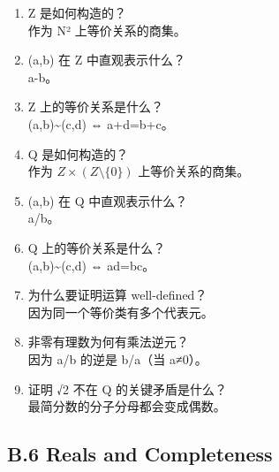 \documentclass[
  11pt,
]{article}
\begin{document}
\begin{enumerate}
\def\labelenumi{\arabic{enumi}.}
\setcounter{enumi}{40}
\item
  Z 是如何构造的？\\
  作为 N² 上等价关系的商集。
\item
  (a,b) 在 Z 中直观表示什么？\\
  a-b。
\item
  Z 上的等价关系是什么？\\
  (a,b)\textasciitilde(c,d) ⇔ a+d=b+c。
\item
  Q 是如何构造的？\\
  作为 \(Z\times (Z\setminus\{0\})\) 上等价关系的商集。
\item
  (a,b) 在 Q 中直观表示什么？\\
  a/b。
\item
  Q 上的等价关系是什么？\\
  (a,b)\textasciitilde(c,d) ⇔ ad=bc。
\item
  为什么要证明运算 well-defined？\\
  因为同一个等价类有多个代表元。
\item
  非零有理数为何有乘法逆元？\\
  因为 a/b 的逆是 b/a（当 a≠0）。
\item
  证明 √2 不在 Q 的关键矛盾是什么？\\
  最简分数的分子分母都会变成偶数。
\end{enumerate}

\subsection{B.6 Reals and
Completeness}\label{b.6-reals-and-completeness}
\end{document}
